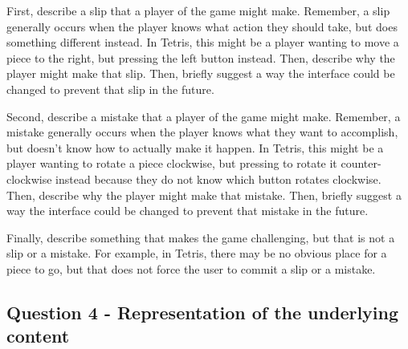 \documentclass[12pt,letterpaper]{article}
\begin{document}
First, describe a slip that a player of the game might make. Remember, a slip generally occurs when the player knows what action they should take, but does something different instead. In Tetris, this might be a player wanting to move a piece to the right, but pressing the left button instead. Then, describe why the player might make that slip. Then, briefly suggest a way the interface could be changed to prevent that slip in the future.

Second, describe a mistake that a player of the game might make. Remember, a mistake generally occurs when the player knows what they want to accomplish, but doesn’t know how to actually make it happen. In Tetris, this might be a player wanting to rotate a piece clockwise, but pressing to rotate it counter-clockwise instead because they do not know which button rotates clockwise. Then, describe why the player might make that mistake. Then, briefly suggest a way the interface could be changed to prevent that mistake in the future.

Finally, describe something that makes the game challenging, but that is not a slip or a mistake. For example, in Tetris, there may be no obvious place for a piece to go, but that does not force the user to commit a slip or a mistake.

\subsection*{Question 4 - Representation of the underlying content}

 

\end{document}
